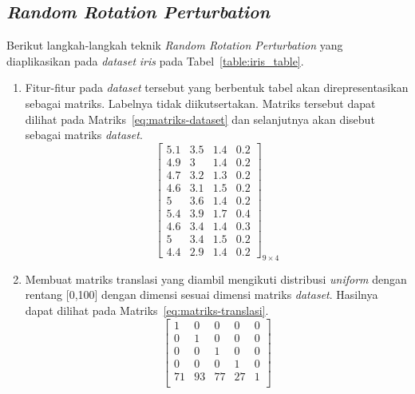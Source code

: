 \subsection{\textit{Random Rotation Perturbation}}
\label{subsec:studi-rrp}

Berikut langkah-langkah teknik \textit{Random Rotation Perturbation} yang diaplikasikan pada \textit{dataset} \textit{iris} pada Tabel~\ref{table:iris_table}.
\begin{enumerate}
    \item Fitur-fitur pada \textit{dataset} tersebut yang berbentuk tabel akan direpresentasikan sebagai matriks. Labelnya tidak diikutsertakan. Matriks tersebut dapat dilihat pada Matriks~\ref{eq:matriks-dataset} dan selanjutnya akan disebut sebagai matriks \textit{dataset}.
    \begin{equation}\label{eq:matriks-dataset}
        \begin{bmatrix}
        5.1		&		3.5		&		1.4		&		0.2	\\
        4.9		&		3		&		1.4		&		0.2	\\
        4.7		&		3.2		&		1.3		&		0.2	\\
        4.6		&		3.1		&		1.5		&		0.2	\\
        5		&		3.6		&		1.4		&		0.2	\\
        5.4		&		3.9		&		1.7		&		0.4	\\
        4.6		&		3.4		&		1.4		&		0.3	\\
        5		&		3.4		&		1.5		&		0.2	\\
        4.4		&		2.9		&		1.4		&		0.2 
        \end{bmatrix}_{9\times 4}
    \end{equation}
    \item Membuat matriks translasi yang diambil mengikuti distribusi \textit{uniform} dengan rentang [0,100] dengan dimensi sesuai dimensi matriks \textit{dataset}. Hasilnya dapat dilihat pada Matriks~\ref{eq:matriks-translasi}.
    \begin{equation}\label{eq:matriks-translasi}
        \begin{bmatrix}
            1				&		0				&		0				&		0			&		0 \\
            0				&		1				&		0				&		0			&		0 \\
            0				&		0				&		1				&		0			&		0 \\
            0				&		0				&		0				&		1 			&		0 \\
            71		&		93		&		77		&		27 &		1 \\

\end{bmatrix}
\end{equation}
\end{enumerate}
